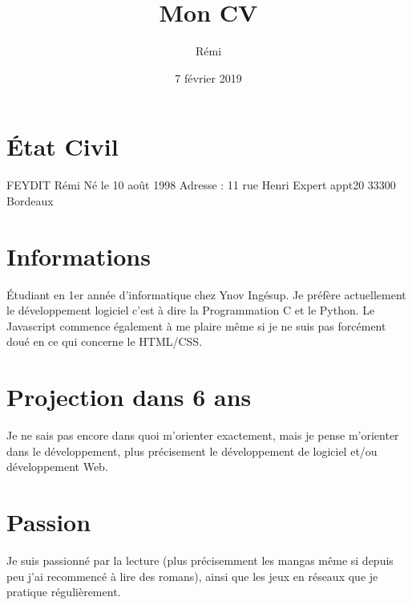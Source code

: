 \documentclass{article}
\title{Mon CV}
\author{Rémi \bsc{Feydit}}
\date{7 février 2019}
\begin{document}
\maketitle
\section{État Civil}
    FEYDIT Rémi\newline
    Né le 10 août 1998\newline
    Adresse : 11 rue Henri Expert appt20 33300 Bordeaux
\section{Informations}
    Étudiant en 1er année d'informatique chez Ynov Ingésup.
    Je préfère actuellement le développement logiciel c'est à dire la Programmation C et le Python. Le Javascript commence également à me plaire même si je ne suis pas forcément doué en ce qui concerne le HTML/CSS.


\section{Projection dans 6 ans}
    Je ne sais pas encore dans quoi m'orienter exactement, mais je pense m'orienter dans le développement, plus précisement le développement de logiciel et/ou développement Web.

\section{Passion}
    Je suis passionné par la lecture (plus précisemment les mangas même si depuis peu j'ai recommencé à lire des romans), ainsi que les jeux en réseaux que je pratique régulièrement.
\end{document}
